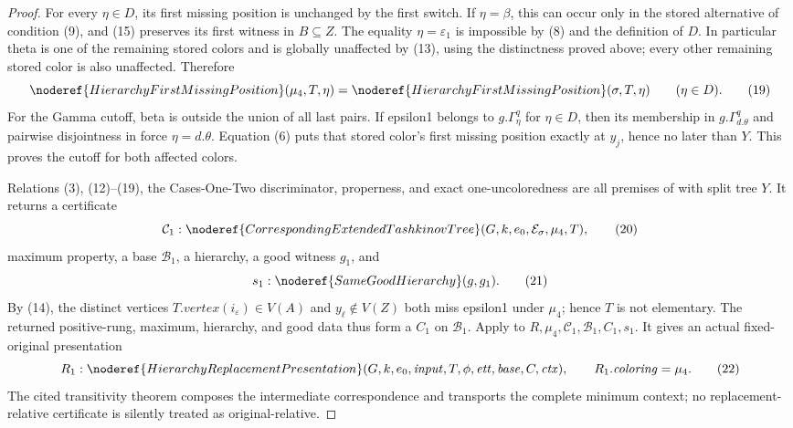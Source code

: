 \begin{proof}
For every $\eta\in D$, its first missing position is unchanged by the
first switch.  If $\eta=\beta$, this can occur only in the stored
alternative of condition (9), and (15) preserves its first witness in
$B\subseteq Z$.  The equality $\eta=\varepsilon _1$ is impossible by
(8) and the definition of $D$.  In particular theta is one of the
remaining stored colors and is globally unaffected by (13), using the
distinctness proved above; every other remaining stored color is also
unaffected.  Therefore
\[
 \noderef{HierarchyFirstMissingPosition}(\mu _4,T,\eta)
 =\noderef{HierarchyFirstMissingPosition}(\sigma,T,\eta)
 \qquad(\eta\in D).                                           \tag{19}
\]
For the Gamma cutoff, beta is outside the union of all last pairs.  If
epsilon1 belongs to $g.\Gamma^q_\eta$ for $\eta\in D$, then its
membership in $g.\Gamma^q_{d.\theta}$ and pairwise disjointness in
 force $\eta=d.\theta$.  Equation (6) puts that
stored color's first missing position exactly at $y_j$, hence no later
than $Y$.  This proves the cutoff for both affected colors.

Relations (3), (12)--(19), the Cases-One-Two discriminator, properness,
and exact one-uncoloredness are all premises of
 with split tree $Y$.  It
returns a certificate
\[
 \mathcal C_1:\noderef{CorrespondingExtendedTashkinovTree}
       (G,k,e_0,\mathcal E_\sigma,\mu _4,T),                   \tag{20}
\]
maximum property, a base $\mathcal B_1$, a hierarchy, a good witness
$g_1$, and
\[
                  s_1:\noderef{SameGoodHierarchy}(g,g_1).     \tag{21}
\]
By (14), the distinct vertices
$T.\mathit{vertex}(i_\varepsilon)\in V(A)$ and
$y_\ell\notin V(Z)$ both miss epsilon1 under $\mu _4$; hence $T$ is not
elementary.  The returned positive-rung, maximum, hierarchy, and good
data thus form a  $C_1$ on
$\mathcal B_1$.  Apply
 to
$R,\mu _4,\mathcal C_1,\mathcal B_1,C_1,s_1$.  It gives an actual
fixed-original presentation
\[
 R_1:\noderef{HierarchyReplacementPresentation}
   (G,k,e_0,\mathit{input},T,\phi,\mathit{ett},\mathit{base},C,
    \mathit{ctx}),\qquad R_1.\mathit{coloring}=\mu _4.        \tag{22}
\]
The cited transitivity theorem composes the intermediate correspondence
and transports the complete minimum context; no replacement-relative
certificate is silently treated as original-relative.


\end{proof}
